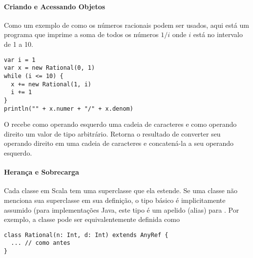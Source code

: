 \paragraph{Criando e Acessando Objetos}
Como um exemplo de como os n\'{u}meros racionais podem ser usados, aqui est\'{a} um programa 
que imprime a soma de todos os n\'{u}meros $1/i$ onde $i$ est\'{a} no intervalo de 1 a 10. 
\begin{lstlisting}
var i = 1
var x = new Rational(0, 1)
while (i <= 10) {
  x += new Rational(1, i)
  i += 1
}
println("" + x.numer + "/" + x.denom)
\end{lstlisting}
O \code{+} recebe como operando esquerdo uma cadeia de caracteres e como 
operando direito um valor de tipo arbitr\'{a}rio. Retorna o resultado de 
converter seu operando direito em uma cadeia de caracteres e concaten\'{a}-la 
a seu operando esquerdo.   

\paragraph{Heran\c{c}a e Sobrecarga}
Cada classe em Scala tem uma superclasse que ela estende.
Se uma classe n\~{a}o menciona sua superclasse em sua defini\c{c}\~{a}o, o tipo b\'{a}sico 
 \'{e} implicitamente assumido (para implementa\c{c}\~{o}es Java, este
tipo \'{e} um apelido (alias) para . Por exemplo, a classe 
 pode ser equivalentemente definida como      
\begin{lstlisting}
class Rational(n: Int, d: Int) extends AnyRef {
  ... // como antes
}
\end{lstlisting}

